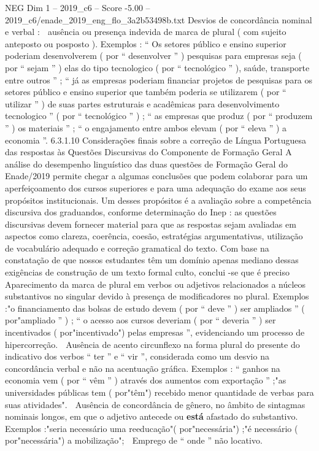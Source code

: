 \begin{textsample}{NEG Dim 1 – 2019\_c6 – Score -5.00 – 2019\_c6/enade\_2019\_eng\_flo\_3a2b53498b.txt}
Desvios de concordância nominal e verbal :  ausência ou presença indevida de marca de plural ( com sujeito anteposto ou posposto ).
Exemplos : “ Os setores público e ensino superior poderiam desenvolverem ( por “ desenvolver ” ) pesquisas para empresas seja ( por “ sejam ” ) elas do tipo tecnologico ( por “ tecnológico ” ), saúde, transporte entre outros ” ; “ já as empresas poderiam financiar projetos de pesquisas para os setores público e ensino superior que também poderia se utilizarem ( por “ utilizar ” ) de suas partes estruturais e acadêmicas para desenvolvimento tecnologico ” ( por “ tecnológico ” ) ; “ as empresas que produz ( por “ produzem ” ) os materiais ” ; “ o engajamento entre ambos elevam ( por “ eleva ” ) a economia ”. 6.3.1.10 Considerações finais sobre a correção de Língua Portuguesa das respostas às Questões Discursivas do Componente de Formação Geral A análise do desempenho linguístico das duas questões de Formação Geral do Enade/2019 permite chegar a algumas conclusões que podem colaborar para um aperfeiçoamento dos cursos superiores e para uma adequação do exame aos seus propósitos institucionais.
Um desses propósitos é a avaliação sobre a competência discursiva dos graduandos, conforme determinação do Inep : as questões discursivas devem fornecer material para que as respostas sejam avaliadas em aspectos como clareza, coerência, coesão, estratégias argumentativas, utilização de vocabulário adequado e correção gramatical do texto.
Com base na constatação de que nossos estudantes têm um domínio apenas mediano dessas exigências de construção de um texto formal culto, conclui -se que é preciso  Aparecimento da marca de plural em verbos ou adjetivos relacionados a núcleos substantivos no singular devido à presença de modificadores no plural.
Exemplos :"o financiamento das bolsas de estudo devem ( por “ deve ” ) ser ampliados ” ( por"ampliado ” ) ; “ o acesso aos cursos deveriam ( por “ deveria ” ) ser incentivados ( por"incentivado") pelas empresas ”, evidenciando um processo de hipercorreção.  Ausência de acento circunflexo na forma plural do presente do indicativo dos verbos “ ter ” e “ vir ”, considerada como um desvio na concordância verbal e não na acentuação gráfica.
Exemplos : “ ganhos na economia vem ( por “ vêm ” ) através dos aumentos com exportação ” ;"as universidades públicas tem ( por"têm") recebido menor quantidade de verbas para suas atividades".  Ausência de concordância de gênero, no âmbito de sintagmas nominais longos, em que o adjetivo antecede ou \textbf{está} afastado do substantivo.
Exemplos :"seria necessário uma reeducação"( por"necessária") ;"é necessário ( por"necessária") a mobilização";  Emprego de “ onde ” não locativo.

\end{textsample}
